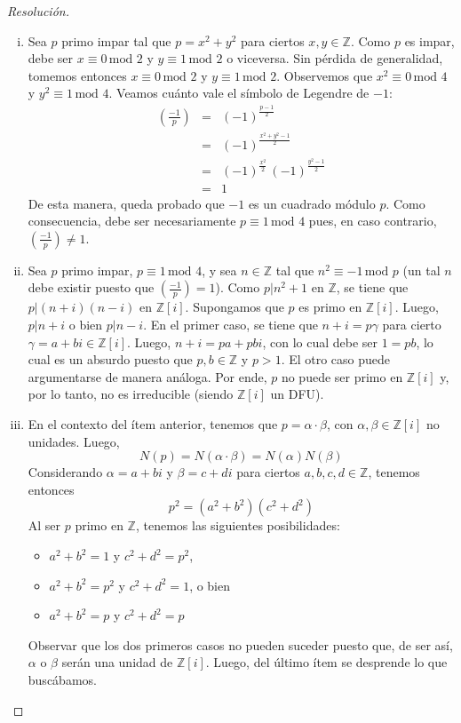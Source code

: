 \documentclass[a4paper,11pt]{article}
\newcommand{\ZZ}{\ensuremath{\mathbb{Z}}}
\newcommand{\Zm}[1]{\ensuremath{\mathbb{Z}[#1]}}
\newcommand{\Cong}[3]{\ensuremath{#1 \equiv #2 \, \textrm{mod } #3}}
\newcommand{\Div}[2]{\ensuremath{#1 | #2}}
\newcommand{\Leg}[2]{\left(\frac{#1}{#2}\right)}
\begin{document}
\begin{proof}[Resoluci\'on]
$ $

\begin{enumerate}[i.]

\item Sea $p$ primo impar tal que $p = x^2 + y^2$ para ciertos $x, y \in \ZZ$.
Como $p$ es impar,
debe ser \Cong{x}{0}{2} y \Cong{y}{1}{2} o viceversa. Sin pérdida de generalidad, tomemos
entonces \Cong{x}{0}{2} y \Cong{y}{1}{2}. Observemos que \Cong{x^2}{0}{4} y 
\Cong{y^2}{1}{4}. Veamos cuánto vale el símbolo de Legendre de $-1$:
\begin{eqnarray*}
    \Leg{-1}{p} &=& (-1)^{\frac{p-1}{2}} \\
                &=& (-1)^{\frac{x^2 + y^2 - 1}{2}} \\
                &=& (-1)^{\frac{x^2}{2}} \, (-1)^{\frac{y^2 - 1}{2}} \\
                &=& 1
\end{eqnarray*}
De esta manera, queda probado que $-1$ es un cuadrado módulo $p$. Como consecuencia, 
debe ser necesariamente \Cong{p}{1}{4} pues, en caso contrario, $\Leg{-1}{p} \neq 1$.

\item Sea $p$ primo impar, $\Cong{p}{1}{4}$, y sea $n \in \ZZ$ tal que 
$\Cong{n^2}{-1}{p}$ (un tal $n$ debe existir puesto que $\Leg{-1}{p} = 1$). Como
$\Div{p}{n^2 + 1}$ en \ZZ, se tiene que $\Div{p}{(n + i)(n - i)}$ en \Zm{i}.
Supongamos que $p$ es primo en \Zm{i}. Luego, $\Div{p}{n+i}$ o bien
$\Div{p}{n-i}$. En el primer caso, se tiene que $n + i = p \gamma$ para cierto
$\gamma = a + bi \in \Zm{i}$. Luego, $n + i = pa + pbi$, con lo cual debe ser
$1 = pb$, lo cual es un absurdo puesto que $p, b \in \ZZ$ y $p > 1$. El otro caso
puede argumentarse de manera análoga. Por ende, $p$ no puede ser primo en \Zm{i} y,
por lo tanto, no es irreducible (siendo \Zm{i} un DFU).

\item En el contexto del ítem anterior, tenemos que $p = \alpha \cdot \beta$, 
con $\alpha, \beta \in \Zm{i}$ no unidades. Luego,
$$N(p) = N(\alpha \cdot \beta) = N(\alpha) N(\beta)$$
Considerando $\alpha = a + bi$ y $\beta = c + di$ para ciertos $a,b,c,d \in \ZZ$,
tenemos entonces
$$p^2 = (a^2 + b^2) (c^2 + d^2)$$
Al ser $p$ primo en \ZZ, tenemos las siguientes posibilidades:
\begin{itemize}
    \item $a^2 + b^2 = 1$ y $c^2 + d^2 = p^2$,
    \item $a^2 + b^2 = p^2$ y $c^2 + d^2 = 1$, o bien
    \item $a^2 + b^2 = p$ y $c^2 + d^2 = p$
\end{itemize}
Observar que los dos primeros casos no pueden suceder puesto que, de ser así,
$\alpha$ o $\beta$ serán una unidad de \Zm{i}. Luego, del último ítem se 
desprende lo que buscábamos.


\end{enumerate}
\end{proof}
\end{document}
